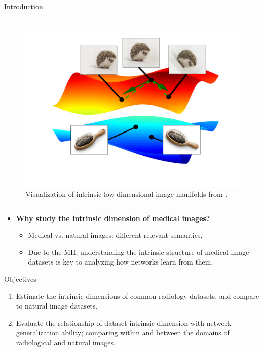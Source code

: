 \documentclass[final,hyperref={pdfpagelabels=false}]{beamer}
\begin{document}
\begin{frame}[t]
\begin{columns}[t]
\begin{column}{.3\textwidth}
\begin{block}{Introduction}
\begin{columns}
\begin{column}{.43\textwidth} %
\centering
\begin{figure}
    \includegraphics[width=0.8\linewidth]{buchanan_etal_fig1.pdf}
     \caption{\,Visualization of intrinsic low-dimensional image manifolds from \cite{buchanan2021deep}.}
\end{figure}
\end{column}
\end{columns} %
\begin{itemize}
\item \textbf{Why study the intrinsic dimension of medical images?}
    \begin{itemize}
        \item Medical vs. natural images: different relevant semantics, 
        \item Due to the MH, understanding the intrinsic structure of medical image datasets is key to analyzing how networks learn from them.
    \end{itemize}
\end{itemize}

\end{block}

\begin{block}{Objectives}

\begin{enumerate}
\item Estimate the intrinsic dimensions of common radiology datasets, and compare to natural image datasets.
\item Evaluate the relationship of dataset intrinsic dimension with network generalization ability; comparing within and between the domains of radiological and natural images.
\end{enumerate}


\end{block}
\end{column}
\end{columns}
\end{frame}
\end{document}
